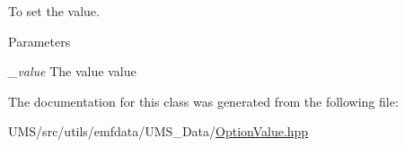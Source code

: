To set the value. 


\begin{DoxyParams}{Parameters}
\item[{\em \_\-value}]The value value \end{DoxyParams}


The documentation for this class was generated from the following file:\begin{DoxyCompactItemize}
\item 
UMS/src/utils/emfdata/UMS\_\-Data/\hyperlink{OptionValue_8hpp}{OptionValue.hpp}\end{DoxyCompactItemize}
